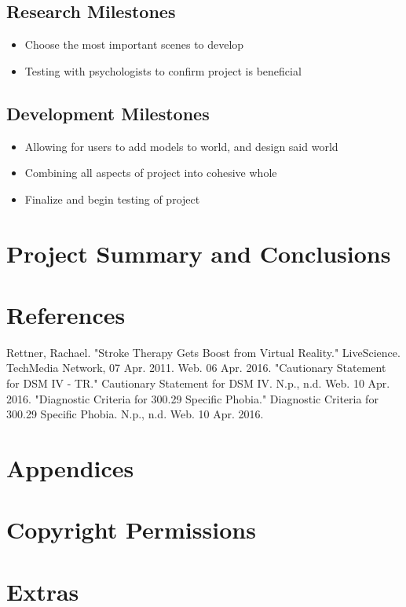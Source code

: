\documentclass[a4paper,10pt]{article}
\begin{document}
	\subsection{Research Milestones}
		\begin{itemize}
			\item Choose the most important scenes to develop
			\item Testing with psychologists to confirm project is beneficial
		\end{itemize}
	\subsection{Development Milestones}
		\begin{itemize}
			\item Allowing for users to add models to world, and design said world
			\item Combining all aspects of project into cohesive whole
			\item Finalize and begin testing of project
		\end{itemize}

\pagebreak
\section{Project Summary and Conclusions}

\pagebreak
{}
\setcounter{page}{1}
\section{References}


\begin{thebibliography}{9}
Rettner, Rachael. "Stroke Therapy Gets Boost from Virtual Reality." LiveScience. TechMedia Network, 07 Apr. 2011. Web. 06 Apr. 2016.
"Cautionary Statement for DSM IV - TR." Cautionary Statement for DSM IV. N.p., n.d. Web. 10 Apr. 2016.
"Diagnostic Criteria for 300.29 Specific Phobia." Diagnostic Criteria for 300.29 Specific Phobia. N.p., n.d. Web. 10 Apr. 2016.
\end{thebibliography}

\section{Appendices}

\section{Copyright Permissions}

\section{Extras}
\end{document}

